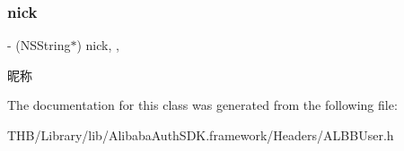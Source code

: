 \subsubsection{\texorpdfstring{nick}{nick}}
{\footnotesize\ttfamily -\/ (N\+S\+String$\ast$) nick\hspace{0.3cm}{\ttfamily [read]}, {\ttfamily [nonatomic]}, {\ttfamily [copy]}}

昵称 

The documentation for this class was generated from the following file\+:\begin{DoxyCompactItemize}
\item 
T\+H\+B/\+Library/lib/\+Alibaba\+Auth\+S\+D\+K.\+framework/\+Headers/A\+L\+B\+B\+User.\+h\end{DoxyCompactItemize}
